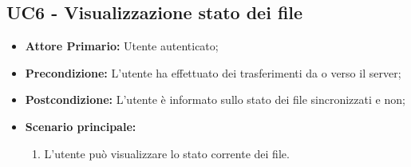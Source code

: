 \subsection{UC6 - Visualizzazione stato dei file}
\begin{itemize}
\item \textbf{Attore Primario:} Utente autenticato;
\item \textbf{Precondizione:} L'utente ha effettuato dei trasferimenti da o verso il server;
\item \textbf{Postcondizione:} L'utente è informato sullo stato dei file sincronizzati e non;
\item \textbf{Scenario principale:}
    \begin{enumerate}
    \item L'utente può visualizzare lo stato corrente dei file.
    \end{enumerate}
\end{itemize}